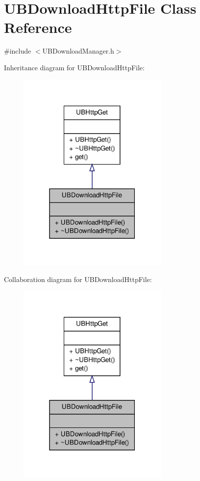 \hypertarget{class_u_b_download_http_file}{\section{U\-B\-Download\-Http\-File Class Reference}
\label{da/d3e/class_u_b_download_http_file}
}


{\ttfamily \#include $<$U\-B\-Download\-Manager.\-h$>$}



Inheritance diagram for U\-B\-Download\-Http\-File\-:
\nopagebreak
\begin{figure}[H]
\begin{center}
\leavevmode
\includegraphics[width=210pt]{d9/d85/class_u_b_download_http_file__inherit__graph}
\end{center}
\end{figure}


Collaboration diagram for U\-B\-Download\-Http\-File\-:
\nopagebreak
\begin{figure}[H]
\begin{center}
\leavevmode
\includegraphics[width=210pt]{d2/d50/class_u_b_download_http_file__coll__graph}
\end{center}
\end{figure}
